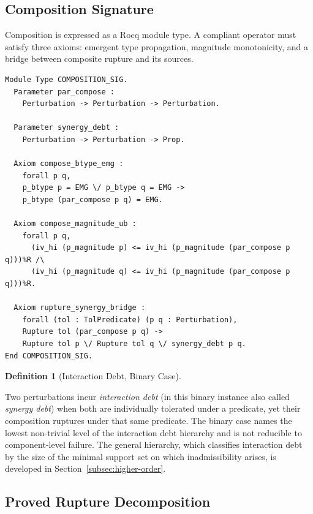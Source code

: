 \documentclass[12pt]{article}
\theoremstyle{plain}
\theoremstyle{definition}
\newtheorem{definition}[theorem]{Definition}
\theoremstyle{remark}
\begin{document}
\subsection{Composition Signature}

Composition is expressed as a Rocq module type.
A compliant operator must satisfy three axioms: emergent type
propagation, magnitude monotonicity, and a bridge between composite
rupture and its sources.

\begin{lstlisting}[style=rocq,
caption={Abstract composition module signature.}]
Module Type COMPOSITION_SIG.
  Parameter par_compose :
    Perturbation -> Perturbation -> Perturbation.

  Parameter synergy_debt :
    Perturbation -> Perturbation -> Prop.

  Axiom compose_btype_emg :
    forall p q,
    p_btype p = EMG \/ p_btype q = EMG ->
    p_btype (par_compose p q) = EMG.

  Axiom compose_magnitude_ub :
    forall p q,
      (iv_hi (p_magnitude p) <= iv_hi (p_magnitude (par_compose p q)))%R /\
      (iv_hi (p_magnitude q) <= iv_hi (p_magnitude (par_compose p q)))%R.

  Axiom rupture_synergy_bridge :
    forall (tol : TolPredicate) (p q : Perturbation),
    Rupture tol (par_compose p q) ->
    Rupture tol p \/ Rupture tol q \/ synergy_debt p q.
End COMPOSITION_SIG.
\end{lstlisting}

\begin{definition}[Interaction Debt, Binary Case]
\label{def:synergy-debt}

Two perturbations incur \emph{interaction debt} (in this binary instance
also called \emph{synergy debt}) when both are individually tolerated
under a predicate, yet their composition ruptures under that same
predicate.
The binary case names the lowest non-trivial level of the interaction
debt hierarchy and is not reducible to component-level failure.
The general hierarchy, which classifies interaction debt by the size
of the minimal support set on which inadmissibility arises, is
developed in Section~\ref{subsec:higher-order}.

\end{definition}

\subsection{Proved Rupture Decomposition}
\end{document}
